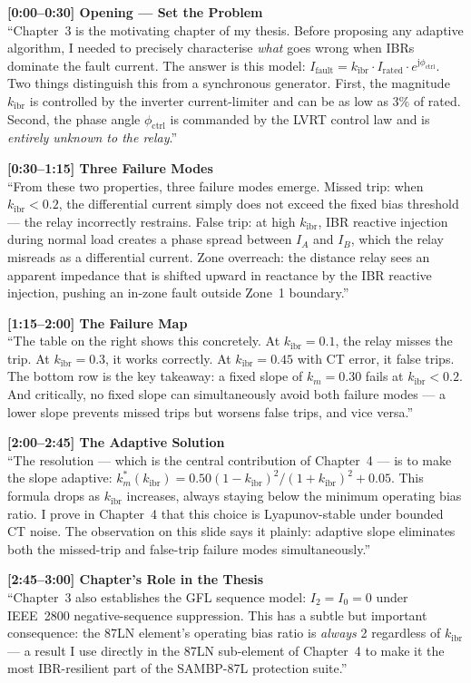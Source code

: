 \documentclass[12pt,a4paper]{article}
\newcommand{\kibr}{k_\mathrm{ibr}}
\newcommand{\Ifault}{I_\mathrm{fault}}
\newcommand{\Irated}{I_\mathrm{rated}}
\newcommand{\km}{k_m}
\newcommand{\phictrl}{\phi_\mathrm{ctrl}}
\newcommand{\jj}{\mathrm{j}}
\begin{document}
\begin{speakbox}
\textbf{[0:00--0:30] Opening --- Set the Problem}\\
``Chapter~3 is the motivating chapter of my thesis.  Before proposing any adaptive
algorithm, I needed to precisely characterise \emph{what} goes wrong when
IBRs dominate the fault current.  The answer is this model:
$\Ifault = \kibr \cdot \Irated \cdot e^{\jj\phictrl}$.
Two things distinguish this from a synchronous generator.  First, the magnitude
$\kibr$ is controlled by the inverter current-limiter and can be as low as 3\% of rated.
Second, the phase angle $\phictrl$ is commanded by the LVRT control law and is
\emph{entirely unknown to the relay}.''

\medskip
\textbf{[0:30--1:15] Three Failure Modes}\\
``From these two properties, three failure modes emerge.  Missed trip: when $\kibr < 0.2$,
the differential current simply does not exceed the fixed bias threshold --- the relay
incorrectly restrains.  False trip: at high $\kibr$, IBR reactive injection during
normal load creates a phase spread between $I_A$ and $I_B$, which the relay misreads
as a differential current.  Zone overreach: the distance relay sees an apparent impedance
that is shifted upward in reactance by the IBR reactive injection, pushing an in-zone
fault outside Zone~1 boundary.''

\medskip
\textbf{[1:15--2:00] The Failure Map}\\
``The table on the right shows this concretely.  At $\kibr = 0.1$, the relay misses the
trip.  At $\kibr = 0.3$, it works correctly.  At $\kibr = 0.45$ with CT error, it false
trips.  The bottom row is the key takeaway: a fixed slope of $\km = 0.30$ fails at
$\kibr < 0.2$.  And critically, no fixed slope can simultaneously avoid both failure
modes --- a lower slope prevents missed trips but worsens false trips, and vice versa.''

\medskip
\textbf{[2:00--2:45] The Adaptive Solution}\\
``The resolution --- which is the central contribution of Chapter~4 --- is to make the
slope adaptive: $\km^*(\kibr) = 0.50(1-\kibr)^2/(1+\kibr)^2 + 0.05$.  This formula
drops as $\kibr$ increases, always staying below the minimum operating bias ratio.
I prove in Chapter~4 that this choice is Lyapunov-stable under bounded CT noise.
The observation on this slide says it plainly: adaptive slope eliminates both the
missed-trip and false-trip failure modes simultaneously.''

\medskip
\textbf{[2:45--3:00] Chapter's Role in the Thesis}\\
``Chapter~3 also establishes the GFL sequence model: $I_2 = I_0 = 0$ under IEEE~2800
negative-sequence suppression.  This has a subtle but important consequence: the 87LN
element's operating bias ratio is \emph{always} 2 regardless of $\kibr$ --- a result
I use directly in the 87LN sub-element of Chapter~4 to make it the most IBR-resilient
part of the SAMBP-87L protection suite.''
\end{speakbox}
\end{document}
